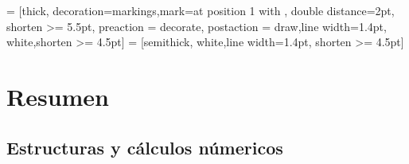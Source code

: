  = [thick, decoration={markings,mark=at position
	1 with {}},
double distance=2pt, shorten >= 5.5pt,
preaction = {decorate},
postaction = {draw,line width=1.4pt, white,shorten >= 4.5pt}]
 = [semithick, white,line width=1.4pt, shorten >= 4.5pt]


\newcommand*{\sdd}{\tikz \draw [baseline, fill=red,draw=red,circular drop shadow] circle (2pt);}
\newcommand*{\sdv}{\tikz \draw [baseline, fill=green,draw=green,circular drop shadow] circle (2pt);}

\section{Resumen }
\subsection{Estructuras y c\'alculos n\'umericos}

